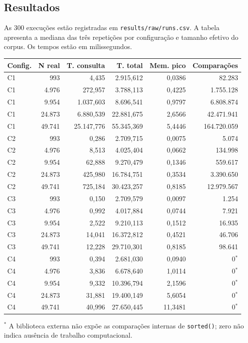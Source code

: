 \documentclass[12pt, a4paper]{article}
\begin{document}
\subsection{Resultados}

As 300 execuções estão registradas em \texttt{results/raw/runs.csv}. A tabela apresenta a mediana das três repetições por configuração e tamanho efetivo do corpus. Os tempos estão em milissegundos.

\begin{center}
\scriptsize
\begin{tabular}{lrrrrr}
\textbf{Config.} & \textbf{N real} & \textbf{T. consulta} & \textbf{T. total} & \textbf{Mem. pico} & \textbf{Comparações} \\
\hline
C1 & 993    & 4,435 & 2.915,612 & 0,0386 & 82.283 \\
C1 & 4.976  & 272,957 & 3.788,113 & 0,4225 & 1.755.128 \\
C1 & 9.954  & 1.037,603 & 8.696,541 & 0,9797 & 6.808.874 \\
C1 & 24.873 & 6.880,539 & 22.881,675 & 2,6566 & 42.471.941 \\
C1 & 49.741 & 25.147,776 & 55.345,369 & 5,4446 & 164.720.059 \\
C2 & 993    & 0,286 & 2.709,715 & 0,0075 & 5.074 \\
C2 & 4.976  & 8,513 & 4.025,404 & 0,0662 & 134.998 \\
C2 & 9.954  & 62,888 & 9.270,479 & 0,1346 & 559.617 \\
C2 & 24.873 & 425,980 & 16.784,751 & 0,3534 & 3.390.650 \\
C2 & 49.741 & 725,184 & 30.423,257 & 0,8185 & 12.979.567 \\
C3 & 993    & 0,150 & 2.709,579 & 0,0097 & 1.254 \\
C3 & 4.976  & 0,992 & 4.017,884 & 0,0744 & 7.921 \\
C3 & 9.954  & 2,522 & 9.210,113 & 0,1512 & 16.935 \\
C3 & 24.873 & 14,041 & 16.372,812 & 0,4521 & 46.706 \\
C3 & 49.741 & 12,228 & 29.710,301 & 0,8185 & 98.641 \\
C4 & 993    & 0,394 & 2.681,030 & 0,0940 & 0$^{*}$ \\
C4 & 4.976  & 3,836 & 6.678,640 & 1,0114 & 0$^{*}$ \\
C4 & 9.954  & 9,332 & 10.396,794 & 2,1596 & 0$^{*}$ \\
C4 & 24.873 & 31,881 & 19.400,149 & 5,6054 & 0$^{*}$ \\
C4 & 49.741 & 40,996 & 27.650,445 & 11,3481 & 0$^{*}$ \\
\end{tabular}
\end{center}
{\footnotesize $^{*}$ A biblioteca externa não expõe as comparações internas de \texttt{sorted()}; zero não indica ausência de trabalho computacional.\par}
\end{document}
